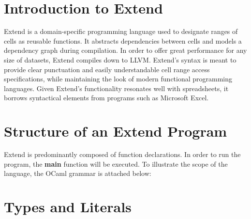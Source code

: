 \section{Introduction to Extend}
	Extend is a domain-specific programming language used to designate ranges of cells as reusable functions. It abstracts dependencies between cells and models a dependency graph during compilation. In order to offer great performance for any size of datasets, Extend compiles down to LLVM.
	\newline
	Extend's syntax is meant to provide clear punctuation and easily understandable cell range access specifications, while maintaining the look of modern functional programming languages. Given Extend's functionality resonates well with spreadsheets, it borrows syntactical elements from programs such as Microsoft Excel.
\section{Structure of an Extend Program}
	Extend is predominantly composed of function declarations. In order to run the program, the \textbf{main} function will be executed. To illustrate the scope of the language, the OCaml grammar is attached below:

\section{Types and Literals}
